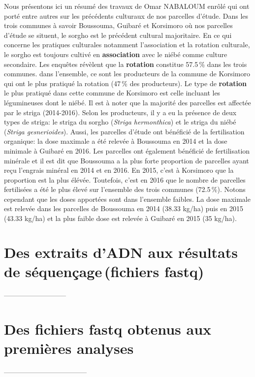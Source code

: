 \documentclass[a4paper,11pt]{article}
\begin{document}
Nous présentons ici un résumé des travaux de Omar NABALOUM enrôlé qui
ont porté entre autres sur les précédents culturaux de nos parcelles
d'étude.  Dans les trois communes à savoir Boussouma, Guibaré et
Korsimoro où nos parcelles d'étude se situent, le sorgho est le
précédent cultural majoritaire.  En ce qui concerne les pratiques
culturales notamment l'association et la rotation culturale, le sorgho
est toujours cultivé en \textbf{association} avec le niébé comme
culture secondaire.  Les enquêtes révèlent que la \textbf{rotation}
constitue 57.5\,\% dans les trois communes. dans l'ensemble, ce sont
les producteurs de la commune de Korsimoro qui ont le plus pratiqué la
rotation (47\,\% des producteurs). Le type de \textbf{rotation} le
plus pratiqué dans cette commune de Korsimoro est celle incluant les
légumineuses dont le niébé.  Il est à noter que la majorité des
parcelles est affectée par le striga (2014-2016). Selon les
producteurs, il y a eu la présence de deux types de striga: le striga
du sorgho (\emph{Striga hermonthica}) et le striga du niébé
(\emph{Striga gesnerioides}). Aussi, les parcelles d'étude ont
bénéficié de la fertilisation organique: la dose maximale a été
relevée à Boussouma en 2014 et la dose minimale à Guibaré en 2016. Les
parcelles ont également bénéficié de fertilisation minérale et il est
dit que Boussouma a la plus forte proportion de parcelles ayant reçu
l'engrais minéral en 2014 et en 2016. En 2015, c'est à Korsimoro que
la proportion est la plus élévée. Toutefois, c'est en 2016 que le
nombre de parcelles fertilisées a été le plus élevé sur l'ensemble des
trois communes (72.5\,\%).  Notons cependant que les doses apportées
sont dans l'ensemble faibles. La dose maximale est relevée dans les
parcelles de Boussouma en 2014 (38.33 kg/ha) puis en 2015 (43.33
kg/ha) et la plus faible dose est relevée à Guibaré en 2015 (35
kg/ha).

\section{Des extraits d'ADN aux résultats de séquençage\,(fichiers fastq)}
 ---------------------------
\section{Des fichiers fastq obtenus aux premières analyses}
------------------------------------
 
\end{document}

